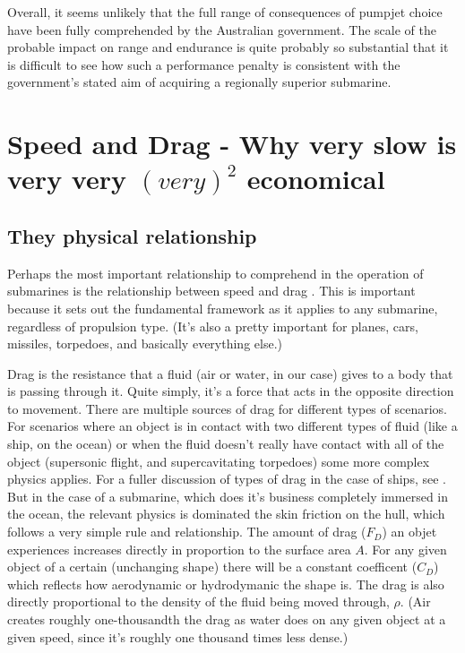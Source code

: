 \documentclass{article}\usepackage[]{graphicx}\usepackage[]{color}
\begin{document}
Overall, it seems unlikely that the full range of consequences of pumpjet choice have been fully comprehended by the Australian government.  The scale of the probable impact on range and endurance is quite probably so substantial that it is difficult to see how such a performance penalty is consistent with the government's stated aim of acquiring a regionally superior submarine.

\newpage  \section{Speed and Drag - Why very slow is very very $(very)^2$ economical}

\subsection{They physical relationship}
Perhaps the most important relationship to comprehend in the operation of submarines is the relationship between speed and drag .  This is important because it sets out the fundamental framework as it applies to any submarine, regardless of propulsion type.  (It's also a pretty important for planes, cars, missiles, torpedoes, and basically everything else.)

Drag is the resistance that a fluid (air or water, in our case) gives to a body that is passing through it. Quite simply, it's a force that acts in the opposite direction to movement.  There are multiple sources of drag for different types of scenarios.  For scenarios where an object is in contact with two different types of fluid (like a ship, on the ocean) or when the fluid doesn't really have contact with all of the object (supersonic flight, and supercavitating torpedoes) some more complex physics applies. For a fuller discussion of types of drag in the case of ships, see \cite{carlton2007}.  But in the case of a submarine, which does it's business completely immersed in the ocean, the relevant physics is dominated the skin friction on the hull, which follows a very simple rule and relationship.  The amount of drag ($F_D$) an objet experiences increases directly in proportion to the surface area $A$.  For any given object of a certain (unchanging shape) there will be a constant coefficent ($C_D$) which reflects how aerodynamic or hydrodymanic the shape is.  The drag is also directly proportional to the density of the fluid being moved through, $\rho$.  (Air creates roughly one-thousandth the drag as water does on any given object at a given speed, since it's roughly one thousand times less dense.)
\end{document}
